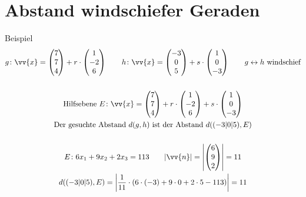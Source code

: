 \section{Abstand windschiefer Geraden}
Beispiel
\begin{gather*}
  g \colon \vv{x} = \begin{pmatrix}7 \\ 7 \\ 4\end{pmatrix} + r \cdot \begin{pmatrix}1 \\ -2 \\ 6\end{pmatrix} \qquad h \colon \vv{x} = \begin{pmatrix}-3 \\ 0 \\ 5\end{pmatrix} + s \cdot \begin{pmatrix}1 \\ 0 \\ -3\end{pmatrix} \qquad g \leftrightarrow h \text{ windschief} \\\\
  \text{Hilfsebene } E \colon \vv{x} = \begin{pmatrix}7 \\ 7 \\ 4\end{pmatrix} + r \cdot \begin{pmatrix}1 \\ -2 \\ 6\end{pmatrix} + s \cdot \begin{pmatrix}1 \\ 0 \\ -3\end{pmatrix} \\
  \text{Der gesuchte Abstand $d(g, h)$ ist der Abstand $d((-3|0|5), E)$} \\\\
  E \colon 6x_1 + 9x_2 + 2x_3 = 113 \qquad |\vv{n}| = \left|\begin{pmatrix}6 \\ 9 \\ 2\end{pmatrix}\right| = 11 \\
  d((-3|0|5), E) = \left|\frac{1}{11} \cdot (6 \cdot (-3) + 9 \cdot 0 + 2 \cdot 5 - 113)\right| = 11
\end{gather*}
